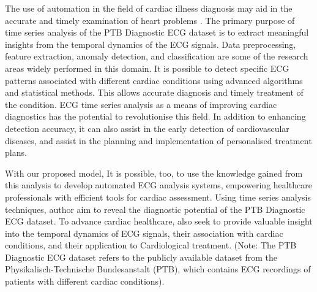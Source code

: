 \documentclass[a4paper, fleqn]{cas-sc}
\begin{document}
\par The use of automation in the field of cardiac illness diagnosis may aid in the accurate and timely examination of heart problems \cite{rahul2020exploratory}. The primary purpose of time series analysis of the PTB Diagnostic ECG dataset is to extract meaningful insights from the temporal dynamics of the ECG signals. Data preprocessing,  feature extraction,  anomaly detection,  and classification are some of the research areas widely performed in this domain. It is possible to detect specific ECG patterns associated with different cardiac conditions using advanced algorithms and statistical methods. This allows accurate diagnosis and timely treatment of the condition. ECG time series analysis as a means of improving cardiac diagnostics has the potential to revolutionise this field. In addition to enhancing detection accuracy,  it can also assist in the early detection of cardiovascular diseases,  and assist in the planning and implementation of personalised treatment plans. \par With our proposed model, It is possible,  too,  to use the knowledge gained from this analysis to develop automated ECG analysis systems,  empowering healthcare professionals with efficient tools for cardiac assessment. Using time series analysis techniques,  author aim to reveal the diagnostic potential of the PTB Diagnostic ECG dataset. To advance cardiac healthcare,  also seek to provide valuable insight into the temporal dynamics of ECG signals,  their association with cardiac conditions,  and their application to Cardiological treatment. (Note: The PTB Diagnostic ECG dataset refers to the publicly available dataset from the Physikalisch-Technische Bundesanstalt (PTB),  which contains ECG recordings of patients with different cardiac conditions).
\end{document}
